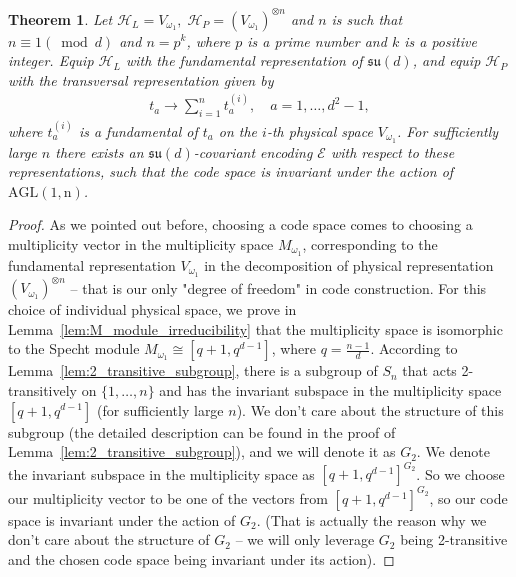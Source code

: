 \documentclass[10pt,twocolumn,superscriptaddress,aps,amsmath,amssymb,citeautoscript,floatfix,prx]{revtex4-2}
\theoremstyle{plain}
\theoremstyle{plain}
\theoremstyle{plain}
\theoremstyle{plain}
\theoremstyle{plain}
\theoremstyle{plain}
\theoremstyle{plain}
\newtheorem{smtheorem}{Theorem}[section]
\theoremstyle{definition}
\theoremstyle{plain}
\begin{document}
\begin{appendix}
\begin{smtheorem}\label{thrm:2_transitive_covariant_code}
        Let
    $
        \mathcal H_L=V_{\omega_1},\;
        \mathcal H_P=(V_{\omega_1})^{\otimes n}
    $
    and $n$ is such that $n \equiv 1(\bmod d)$ and $n=p^k$, where $p$ is a prime number and $k$ is a positive integer.
    Equip \(\mathcal H_L\) with the fundamental representation of
    \(\mathfrak{su}(d)\), and equip \(\mathcal H_P\) with the transversal
    representation given by
    \begin{equation}
    \begin{gathered}
    t_a \rightarrow \sum_{i=1}^n t_a^{(i)}, \quad a=1,\ldots,d^2-1,
    \end{gathered}
    \end{equation} 
    where $t_a^{(i)}$ is a fundamental of $t_a$ on the $i$-th physical space $V_{\omega_1}$.
    For sufficiently
    large $n$ there exists an $\mathfrak{su}(d)$-covariant encoding $\mathcal{E}$ with respect to these representations, 
    such that the code space is invariant under the action of $\mathrm{AGL(1, n)}$. 
\end{smtheorem}
\begin{proof}
    As we pointed out before, choosing a code space comes to choosing a multiplicity vector in the multiplicity space $M_{\omega_1}$,
    corresponding to the fundamental representation $V_{\omega_1}$ in the decomposition of physical representation $(V_{\omega_1})^{\otimes n}$ -- that is our only "degree of freedom" in code construction. 
    For this choice of individual physical space, we prove in Lemma~\ref{lem:M_module_irreducibility} that the multiplicity space is isomorphic to the Specht module $M_{\omega_1}\cong [q+1, q^{d-1}]$, 
    where $q=\frac{n-1}{d}$. According to Lemma~\ref{lem:2_transitive_subgroup}, there is a subgroup of $S_n$ that acts 2-transitively on $\{1, \dots, n\}$ and has the invariant subspace in the multiplicity space $[q+1, q^{d-1}]$ 
    (for sufficiently large $n$). We don't care about the structure of this subgroup (the detailed description can be found in the proof of Lemma~\ref{lem:2_transitive_subgroup}), 
    and we will denote it as $G_2$. We denote the invariant subspace in the multiplicity space as $[q+1, q^{d-1}]^{G_2}$. 
    So we choose our multiplicity vector to be one of the vectors from $[q+1, q^{d-1}]^{G_2}$, so our code space is invariant under the action of $G_2$. 
    (That is actually the reason why we don't care about the structure of $G_2$ -- we will only leverage $G_2$ being 2-transitive and the chosen code space being invariant under its action).
\end{proof}


\end{appendix}
\end{document}
